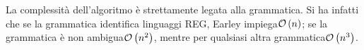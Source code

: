 \documentclass{subfiles}
\begin{document}
La complessità dell'algoritmo è strettamente legata alla grammatica.
Si ha infatti che se la grammatica identifica linguaggi REG, Earley impiega\(\operatorname{\mathcal{O}} \left(n\right)\);
se la grammatica è non ambigua\(\operatorname{\mathcal{O}} \left(n^{2}\right)\), mentre per qualsiasi altra grammatica\(\operatorname{\mathcal{O}} \left(n^{3}\right)\).
\end{document}
